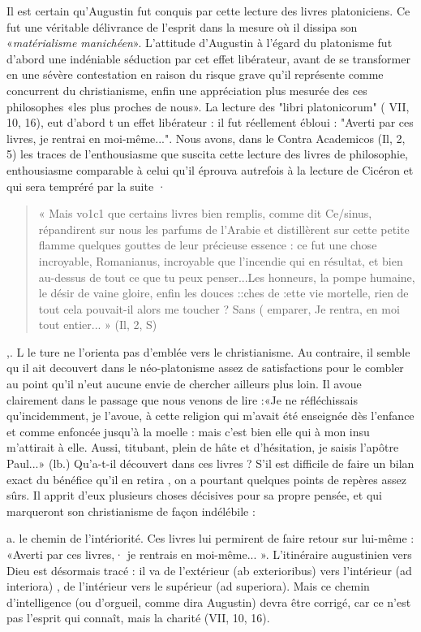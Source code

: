 Il est certain qu'Augustin fut conquis par cette lecture des livres platoniciens. Ce fut  une  véritable  délivrance  de  l'esprit  dans la mesure où il dissipa son
«\textit{matérialisme  manichéen}». L'attitude d'Augustin à l'égard du platonisme fut d'abord une indéniable séduction par cet effet libérateur, avant de se transformer en une sévère contestation en raison du risque grave qu'il représente comme concurrent du christianisme, enfin une appréciation plus mesurée des ces philosophes «les plus proches de nous».  La lecture des "libri platonicorum" ( VII, 10, 16), eut d'abord t un effet  libérateur : il fut réellement ébloui : "Averti par ces livres, je rentrai en moi-même...". Nous avons, dans le Contra Academicos (Il, 2, 5) les traces de l'enthousiasme que suscita cette lecture des livres de philosophie,  enthousiasme
comparable à celui qu'il éprouva autrefois à la lecture de Cicéron et qui sera tempréré par la suite	·
\begin{quote}
    « Mais vo1c1 que certains livres bien remplis, comme dit Ce/sinus, répandirent sur nous les parfums de l'Arabie et distillèrent sur cette petite flamme quelques gouttes de leur précieuse essence : ce fut une chose incroyable, Romanianus, incroyable que l'incendie qui en résultat, et bien au-dessus de tout ce que tu peux penser...Les honneurs, la pompe humaine, le désir de vaine gloire, enfin les douces
::ches de :ette vie mortelle, rien de tout cela pouvait-il alors me toucher ? Sans	(
emparer, Je rentra, en moi tout entier... » (Il, 2, S)
\end{quote}


,. L  le ture ne l'orienta pas d'emblée vers le christianisme. Au contraire, il semble qu il ait decouvert dans le néo-platonisme assez de satisfactions pour le combler au point qu'il n'eut aucune envie de chercher ailleurs plus loin. Il avoue clairement dans le passage que nous venons de lire :«Je ne réfléchissais qu'incidemment, je l'avoue, à cette religion qui m'avait été enseignée dès l'enfance et comme enfoncée jusqu'à la moelle : mais c'est bien elle qui à mon insu m'attirait à elle. Aussi, titubant, plein de hâte et d'hésitation, je saisis l'apôtre Paul...» (lb.) Qu'a-t-il découvert dans ces livres ? S'il est difficile de faire un bilan exact du bénéfice qu'il en retira , on a pourtant quelques points de repères assez sûrs. Il   apprit  d'eux   plusieurs
choses  décisives  pour  sa  propre  pensée, et qui marqueront son christianisme
de façon indélébile :

a.	le  chemin de l'intériorité. Ces livres lui permirent de faire retour sur lui-même : «Averti par ces livres,· je rentrais en moi-même... ». L'itinéraire augustinien vers Dieu est désormais tracé : il va de l'extérieur (ab exterioribus) vers l'intérieur (ad interiora) , de l'intérieur vers le supérieur (ad superiora). Mais ce chemin d'intelligence (ou d'orgueil, comme dira Augustin) devra être corrigé, car ce n'est pas l'esprit qui connaît, mais la charité (VII, 10, 16).

